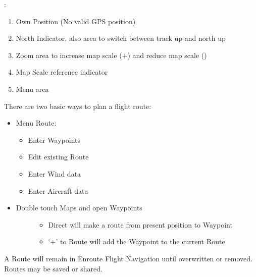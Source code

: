 \documentclass[letterpaper,10pt,english]{sphinxmanual}
\begin{document}
:
\begin{enumerate}
%
\item {} 
Own Position (No valid GPS position)

\item {} 
North Indicator, also area to switch between track up and north up

\item {} 
Zoom area to increase map scale (+) and reduce map scale (\sphinxhyphen{})

\item {} 
Map Scale reference indicator

\item {} 
Menu area

\end{enumerate}

There are two basic ways to plan a flight route:
\begin{itemize}
\item {} 
Menu \sphinxhyphen{} Route:
\begin{itemize}
\item {} 
Enter Waypoints

\item {} 
Edit existing Route

\item {} 
Enter Wind data

\item {} 
Enter Aircraft data

\end{itemize}

\item {} \begin{description}
\item[{Double touch Maps and open Waypoints}] \leavevmode\begin{itemize}
\item {} 
Direct will make a route from present position to Waypoint

\item {} 
‘+’ to Route will add the Waypoint to the current Route

\end{itemize}

\end{description}

\end{itemize}

A Route will remain in Enroute Flight Navigation until overwritten or removed. Routes may be saved or shared.
\end{document}
